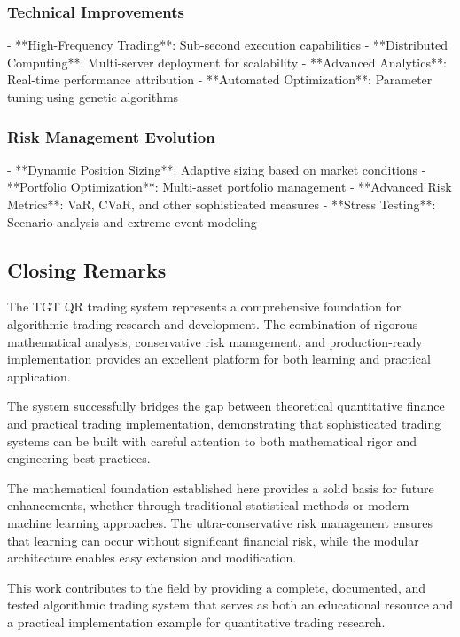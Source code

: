 \documentclass[12pt,a4paper]{article}
\begin{document}
\subsubsection{Technical Improvements}
- **High-Frequency Trading**: Sub-second execution capabilities
- **Distributed Computing**: Multi-server deployment for scalability
- **Advanced Analytics**: Real-time performance attribution
- **Automated Optimization**: Parameter tuning using genetic algorithms

\subsubsection{Risk Management Evolution}
- **Dynamic Position Sizing**: Adaptive sizing based on market conditions
- **Portfolio Optimization**: Multi-asset portfolio management
- **Advanced Risk Metrics**: VaR, CVaR, and other sophisticated measures
- **Stress Testing**: Scenario analysis and extreme event modeling

\subsection{Closing Remarks}

The TGT QR trading system represents a comprehensive foundation for algorithmic trading research and development. The combination of rigorous mathematical analysis, conservative risk management, and production-ready implementation provides an excellent platform for both learning and practical application.

The system successfully bridges the gap between theoretical quantitative finance and practical trading implementation, demonstrating that sophisticated trading systems can be built with careful attention to both mathematical rigor and engineering best practices.

The mathematical foundation established here provides a solid basis for future enhancements, whether through traditional statistical methods or modern machine learning approaches. The ultra-conservative risk management ensures that learning can occur without significant financial risk, while the modular architecture enables easy extension and modification.

This work contributes to the field by providing a complete, documented, and tested algorithmic trading system that serves as both an educational resource and a practical implementation example for quantitative trading research.
\end{document}

